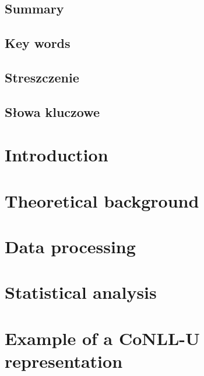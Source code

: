 \documentclass[12pt]{report}
\begin{document}


\pagestyle{empty}
\section*{Summary}
%
\section*{Key words}
%

\newpage
\pagestyle{empty}
\section*{Streszczenie}
%
\section*{Słowa kluczowe}
%

\tableofcontents

\pagestyle{fancy}
\chapter{Introduction}\label{ch:introduction}
    
\chapter{Theoretical background}
    
\chapter{Data processing}
    
\chapter{Statistical analysis}
    

\appendix
\chapter{Example of a CoNLL-U representation}\label{ap:conllu}
    


\end{document}

